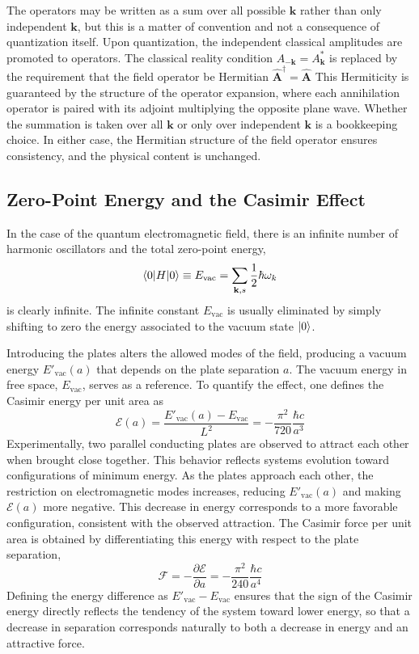 \documentclass[../../../main.tex]{subfiles}
\begin{document}
The operators may be written as a sum over all possible $\mathbf{k}$ rather than only independent $\mathbf{k}$, but this is a matter of convention and not a consequence of quantization itself.
Upon quantization, the independent classical amplitudes are promoted to operators.
The classical reality condition  $A_{-\mathbf{k}} = A_{\mathbf{k}}^*$ is replaced by the requirement that the field operator be Hermitian $\hat{\mathbf A}^\dagger = \hat{\mathbf A}$
This Hermiticity is guaranteed by the structure of the operator expansion, where each annihilation operator is paired with its adjoint multiplying the opposite plane wave.
Whether the summation is taken over all $\mathbf{k}$ or only over independent $\mathbf{k}$ is a bookkeeping choice. In either case, the Hermitian structure of the field operator ensures consistency, and the physical content is unchanged.

\subsection{Zero-Point Energy and the Casimir Effect}
In the case of the quantum electromagnetic field, there is an infinite number of harmonic oscillators and the total zero-point energy,
\begin{equation*}
  \braket{0 | H |0 }\equiv E_{\text{vac}}= \sum_{\mathbf{k },s } \frac{1 }{2 }\hbar \omega_k
\end{equation*}
is clearly infinite.
The infinite constant $E_\text{vac}$ is usually eliminated by simply shifting to zero the energy associated to the vacuum state $\ket{0}$.

Introducing the plates alters the allowed modes of the field, producing a vacuum energy $E'_\text{vac}(a)$ that depends on the plate separation $a$. The vacuum energy in free space, $E_\text{vac}$, serves as a reference.
To quantify the effect, one defines the Casimir energy per unit area as
\begin{equation*}
  \mathcal{E}(a) = \frac{E'_\text{vac}(a) - E_\text{vac}}{L^2}= -\frac{\pi^2 }{720 }\frac{\hbar c }{a^3}
\end{equation*}
Experimentally, two parallel conducting plates are observed to attract each other when brought close together.
This behavior reflects  systems evolution toward configurations of minimum energy.
As the plates approach each other, the restriction on electromagnetic modes increases, reducing $E'_\text{vac}(a)$ and making $\mathcal{E}(a)$ more negative.
This decrease in energy corresponds to a more favorable configuration, consistent with the observed attraction.
The Casimir force per unit area is obtained by differentiating this energy with respect to the plate separation,
\begin{equation*}
  \mathcal{F} = - \frac{\partial \mathcal{E}}{\partial a} = - \frac{\pi^2 }{240 }\frac{\hbar c }{a^4}
\end{equation*}
Defining the energy difference as $E'_\text{vac} - E_\text{vac}$ ensures that the sign of the Casimir energy directly reflects the tendency of the system toward lower energy, so that a decrease in separation corresponds naturally to both a decrease in energy and an attractive force.
\end{document}
